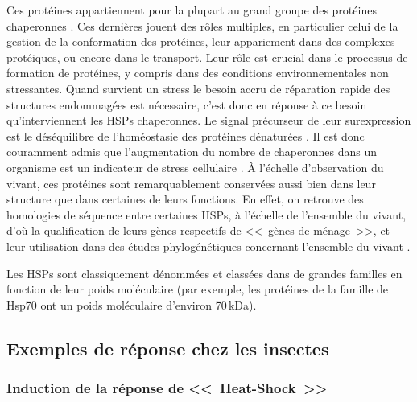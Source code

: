 	Ces protéines appartiennent pour la plupart au grand groupe des protéines chaperonnes \cite{federhoffmann1999}.
	Ces dernières jouent des rôles multiples, en particulier celui de la gestion de la conformation des protéines, leur appariement dans des complexes protéiques, ou encore dans le transport.
	Leur rôle est crucial dans le processus de formation de protéines, y compris dans des conditions environnementales non stressantes.
	Quand survient un stress le besoin accru de réparation rapide des structures endommagées est nécessaire, c'est donc en réponse à ce besoin qu'interviennent les HSPs chaperonnes.
	Le signal précurseur de leur surexpression est le déséquilibre de l'homéostasie des protéines dénaturées \cite{ananthan1986}.
	Il est donc couramment admis que l'augmentation du nombre de chaperonnes dans un organisme est un indicateur de stress cellulaire \cite{ryan1996}.
	À l'échelle d'observation du vivant, ces protéines sont remarquablement conservées aussi bien dans leur structure que dans certaines de leurs fonctions.
	En effet, on retrouve des homologies de séquence entre certaines HSPs, à l'échelle de l'ensemble du vivant, d'où la qualification de leurs gènes respectifs de <<~gènes de ménage~>>, et leur utilisation dans des études phylogénétiques concernant l'ensemble du vivant \cite{gupta1995}.

	Les HSPs sont classiquement dénommées et classées dans de grandes familles en fonction de leur poids moléculaire (par exemple, les protéines de la famille de Hsp70 ont un poids moléculaire d'environ 70\,kDa).


	\subsection{Exemples de réponse chez les insectes}

		\subsubsection{Induction de la réponse de <<~Heat-Shock~>>}
